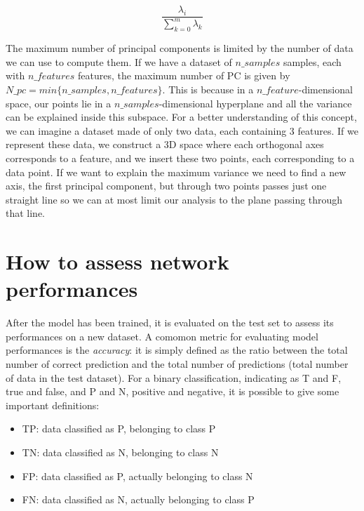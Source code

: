 \documentclass[11pt]{report}
\begin{document}
\begin{equation}
\frac{\lambda_i}{\sum_{k = 0}^m \lambda_k}
\end{equation}

\begin{notes}
\item The maximum number of principal components is limited by the number of data we can use to compute them.
If we have a dataset of $n\_samples$ samples, each with $n\_features$ features, the maximum number of PC is given by $N\_pc = min\{n\_samples, n\_features\}$.
This is because in a $n\_feature$-dimensional space, our points lie in a $n\_samples$-dimensional hyperplane and all the variance can be explained inside this subspace.
For a better understanding of this concept, we can imagine a dataset made of only two data, each containing 3 features. If we represent these data, we construct a 3D space where each orthogonal axes corresponds to a feature, and we insert these two points, each corresponding to a data point.
If we want to explain the maximum variance we need to find a new axis, the first principal component, but through two points passes just one straight line so we can at most limit our analysis to the plane passing through that line.
\end{notes}


\section{How to assess network performances}
After the model has been trained, it is evaluated on the test set to assess its performances on a new dataset.
A comomon metric for evaluating model performances is the \emph{accuracy}: it is simply defined as the ratio between the total number of correct prediction and the total number of predictions (total number of data in the test dataset).
For a binary classification, indicating as T and F, true and false, and P and N, positive and negative, it is possible to give some important definitions:
\begin{itemize}
\item TP: data classified as P, belonging to class P
\item TN: data classified as N, belonging to class N
\item FP: data classified as P, actually belonging to class N
\item FN: data classified as N, actually belonging to class P
\end{itemize}
\end{document}

